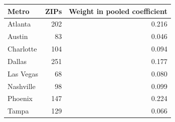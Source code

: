 \footnotesize\setlength{\tabcolsep}{4pt}
\begin{tabular}{lrr}
\toprule
Metro & ZIPs & Weight in pooled coefficient \\
\midrule
Atlanta & 202 & 0.216 \\
Austin & 83 & 0.046 \\
Charlotte & 104 & 0.094 \\
Dallas & 251 & 0.177 \\
Las Vegas & 68 & 0.080 \\
Nashville & 98 & 0.099 \\
Phoenix & 147 & 0.224 \\
Tampa & 129 & 0.066 \\
\bottomrule
\end{tabular}
